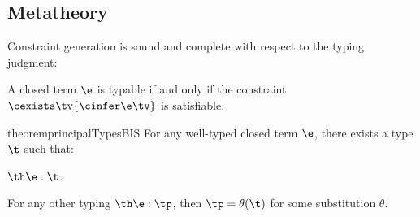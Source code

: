 \documentclass[acmsmall,screen,nonacm%
\Anonymous{,anonymous}{}%
\Final{}{,review}%
]{acmart}
\begin{document}
\subsection{Metatheory}
\label{sec/oml/metatheory}

Constraint generation is sound and complete with respect to the typing judgment:
%
\begin{theorem}
  \label{thm:constraint-gen-is-sound-and-complete}
A closed \OML term $\e$ is typable if and only if
the constraint $\cexists \tv {\cinfer \e \tv}$ is satisfiable.
\end{theorem}

\begin{restatable}{theorem}{principalTypesBIS}
\label{thm:principal-types}
For any well-typed closed \OML term $\e$, there exists a type $\t$
such that:
\begin{enumerate*}[(\roman*)]
\item
  $\th \e : \t$.
\item
  For any other typing $\th \e : \tp$, then $\tp = \theta(\t)$ for some
  substitution $\theta$.
\end{enumerate*}
\end{restatable}
\end{document}
